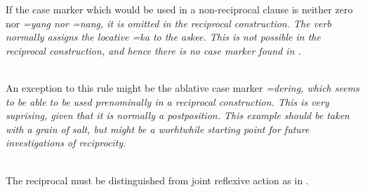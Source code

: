 If the case marker which would be used in a non-reciprocal clause is neither zero nor \em =yang \em nor \em =nang\em, it is omitted in the reciprocal construction. The verb  normally assigns the locative \em =ka \em to the askee. This is not possible in the reciprocal construction, and hence there is no case marker found in .

 \\
An exception to this rule might be the ablative case marker \em =dering\em, which seems to be able to be used prenominally in a reciprocal construction. This is very suprising, given that it is normally a \em post\em position. This example should be taken with a grain of salt, but might be a worhtwhile starting point for future investigations of reciprocity.

 \\
The reciprocal must be distinguished from joint reflexive action as in .

 \\




%




